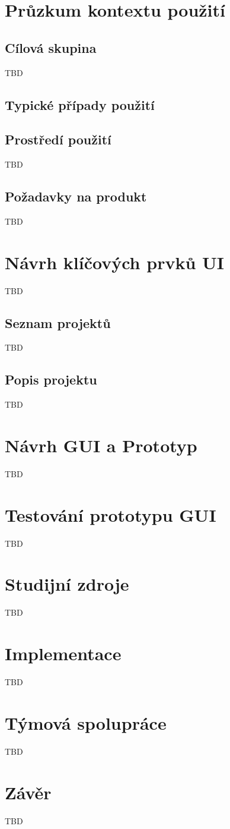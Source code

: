 \documentclass[a4paper,11pt]{article}
\begin{document}
\section{Průzkum kontextu použití}
\subsection{Cílová skupina}
TBD

\subsection {Typické případy použití}


\subsection{Prostředí použití}
TBD

\subsection{Požadavky na produkt}
TBD
\section{Návrh klíčových prvků UI}
TBD

\subsection{Seznam projektů}
TBD

\subsection{ Popis projektu}
TBD

\section{Návrh GUI a Prototyp}
TBD

\section{Testování prototypu GUI}
TBD

\section{Studijní zdroje}
TBD

\section{Implementace}
TBD

\section{Týmová spolupráce}
TBD

\section{Závěr}
TBD
\end{document}
